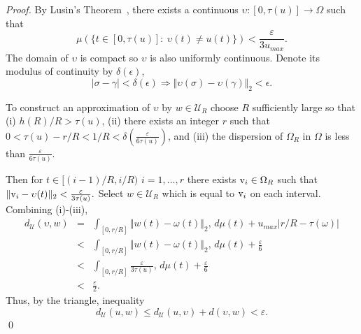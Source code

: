 \documentclass{llncs}
\begin{document}
\begin{proof}

By Lusin's Theorem~\cite[pg. 41]{kolmogorov1961elements}, there exists
a continuous $\upsilon:[0,\tau(u)]\rightarrow\Omega$ such that 
\begin{equation}
\mu(\{t\in[0,\tau(u)]:\:\upsilon(t)\neq u(t)\})<\frac{\varepsilon}{3u_{max}}.
\end{equation}
The domain of $\upsilon$ is compact so $\upsilon$ is also uniformly continuous. Denote its modulus of continuity by $\delta(\epsilon)$,
\begin{equation}
|\sigma-\gamma|<\delta(\epsilon)\Rightarrow\Vert\upsilon(\sigma)-\upsilon(\gamma)\Vert_{2}<\epsilon.
\end{equation}


To construct an approximation of $\upsilon$ by $w\in\mathcal{U}_{R}$
choose $R$ sufficiently large so that (i) $h(R)/R>\tau(u)$,
(ii) there exists an integer $r$ such that $0<\tau(u)-r/R<1/R<\delta\left(\frac{\varepsilon}{6\tau(u)}\right)$,
and (iii) the dispersion of $\Omega_{R}$ in $\Omega$ is less than $\frac{\varepsilon}{6\tau(u)}$. 

Then for $t\in[(i-1)/R,i/R)$ $i=1,...,r$ there exists ${\rm v}_{i}\in\Omega_{R}$
such that $\Vert {\rm v}_{i}-\upsilon(t)\Vert_{2}<\frac{\varepsilon}{3\tau(u)}.$
Select $w\in\mathcal{U}_{R}$ which is equal to ${\rm v}_{i}$ on
each interval. Combining (i)-(iii), 
\begin{equation}
\begin{array}{rcl}
d_{\mathcal{U}}(\upsilon,w) & = & \int_{[0,r/R]}\Vert w(t)-\omega(t)\Vert_{2},\, d\mu(t)+u_{max}|r/R-\tau(\omega)|\\
 & < & \int_{[0,r/R]}\Vert w(t)-\omega(t)\Vert_{2},\, d\mu(t)+\frac{\varepsilon}{6}\\
 & < & \int_{[0,r/R]}\frac{\varepsilon}{3\tau(u)},\, d\mu(t)+\frac{\varepsilon}{6}\\
 & < & \frac{\varepsilon}{2}.
\end{array}
\end{equation}
Thus, by the triangle, inequality
\begin{equation}
d_{\mathcal{U}}(u,w)\leq d_{\mathcal{U}}(u,\upsilon)+d(\upsilon,w)<\varepsilon.
\end{equation}
\qed
\end{proof}
\end{document}
